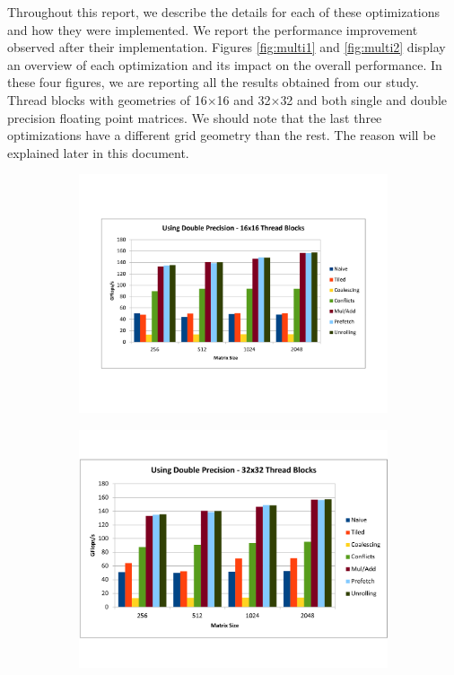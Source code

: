 \documentclass[paper=a4, fontsize=11pt]{scrartcl} %
\numberwithin{equation}{section} %
\numberwithin{figure}{section} %
\numberwithin{table}{section} %
\begin{document}
Throughout this report, we describe the details for each of these optimizations and how they were implemented. We report the performance improvement observed after their implementation. Figures \ref{fig:multi1} and \ref{fig:multi2} display an overview of each optimization and its impact on the overall performance. In these four figures, we are reporting all the results obtained from our study. Thread blocks with geometries of 16$\times$16 and 32$\times$32 and both single and double precision floating point matrices. We should note that the last three optimizations have a different grid geometry than the rest. The reason will be explained later in this document.

\begin{figure} [h]
\centering
\begin{subfigure}{.5\textwidth}
  \centering
  \includegraphics[width=1.07\linewidth]{figures/all_Double_16.pdf}
  \label{fig:all_double_16}
\end{subfigure}%
\begin{subfigure}{.5\textwidth}
  \centering
  \includegraphics[width=\linewidth]{figures/all_Double_32.pdf}

\end{subfigure}
\end{figure}
\end{document}
